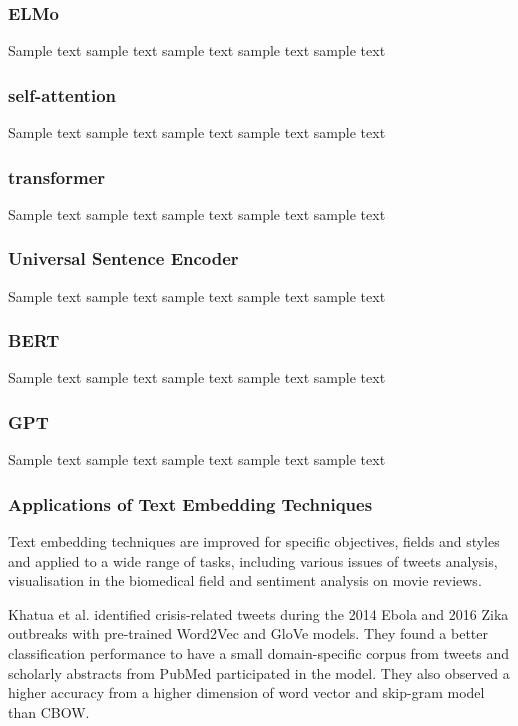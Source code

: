 \subsubsection{ELMo}
Sample text sample text sample text sample text sample text

\subsubsection{self-attention}
Sample text sample text sample text sample text sample text

\subsubsection{transformer}
Sample text sample text sample text sample text sample text

\subsubsection{Universal Sentence Encoder}
Sample text sample text sample text sample text sample text

\subsubsection{BERT}
Sample text sample text sample text sample text sample text

\subsubsection{GPT}
Sample text sample text sample text sample text sample text

\subsubsection{Applications of Text Embedding Techniques}
Text embedding techniques are improved for specific objectives, fields and styles and applied to a wide range of tasks, including various issues of tweets analysis\cite{mottaghinia2021}, visualisation in the biomedical field\cite{oubenali2022} and sentiment analysis on movie reviews\cite{sivakumar2021}.

Khatua et al.\cite{khatua2019} identified crisis-related tweets during the 2014 Ebola and 2016 Zika outbreaks with pre-trained Word2Vec and GloVe models.
They found a better classification performance to have a small domain-specific corpus from tweets and scholarly abstracts from PubMed participated in the model.
They also observed a higher accuracy from a higher dimension of word vector and skip-gram model than CBOW.


